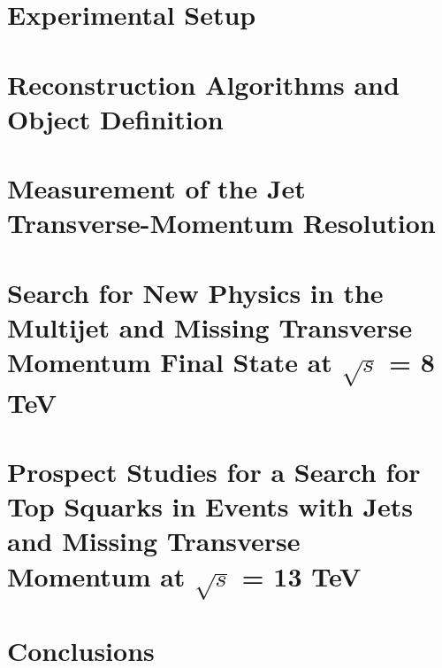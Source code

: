 \documentclass[
twoside=true,
BCOR10mm,
headsepline,     %
headings=normal,
open=right,
numbers=noenddot, %
a4paper
]{scrreprt} %
\begin{document}
\chapter{Experimental Setup} \label{chap:Detector}


\chapter{Reconstruction Algorithms and Object Definition} \label{chap:Objects}


\chapter{Measurement of the Jet Transverse-Momentum Resolution} \label{chap:Resolution}


\chapter[Search for New Physics with Jets and Missing Transverse Momentum]{Search for New Physics in the Multijet and Missing Transverse Momentum Final State at $\sqrt{s}$ = 8 TeV} \label{chap:RA2}


\chapter[Prospect Studies for a Search for Top Squarks at $\sqrt{s}$ = 13 TeV]{Prospect Studies for a Search for Top Squarks in Events with Jets and Missing Transverse Momentum at $\sqrt{s}$ = 13 TeV} \label{chap:Stop}


\chapter{Conclusions} \label{chap:Conclusion}



\appendix
%





\cleardoublepage
\thispagestyle{empty}
\chapter*{~}
%
\end{document}
